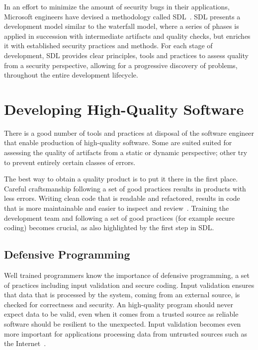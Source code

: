 In an effort to minimize the amount of security bugs in their applications,
Microsoft engineers have devised a methodology called
\ac{SDL}~\cite{lipner2004trustworthy}. \ac{SDL} presents a development model
similar to the waterfall model, where a series of phases is applied in
succession with intermediate artifacts and quality checks, but enriches it with
established security practices and methods. For each stage of development,
\ac{SDL} provides clear principles, tools and practices to assess quality from a
security perspective, allowing for a progressive discovery of problems,
throughout the entire development lifecycle.

\section{Developing High-Quality Software}
\label{sec:dev-hq-sw}
There is a good number of tools and practices at disposal of the software
engineer that enable production of high-quality software. Some are suited suited
for assessing the quality of artifacts from a static or dynamic perspective;
other try to prevent entirely certain classes of errors.

The best way to obtain a quality product is to put it there in the first place.
Careful craftsmanship following a set of good practices results in products with
less errors. Writing clean code that is readable and refactored, results in code
that is more maintainable and easier to inspect and
review~\cite{martin2009clean,fowler1999refactoring}. Training the development
team and following a set of good practices (for example secure coding) becomes
crucial, as also highlighted by the first step in \ac{SDL}.

\subsection{Defensive Programming}
Well trained programmers know the importance of defensive programming, a set of
practices including input validation and secure coding. Input validation ensures
that data that is processed by the system, coming from an external source, is
checked for correctness and security. An high-quality program should never
expect data to be valid, even when it comes from a trusted source as reliable
software should be resilient to the unexpected. Input validation becomes even
more important for applications processing data from untrusted sources such as
the Internet~\cite{scholte2012have}.

